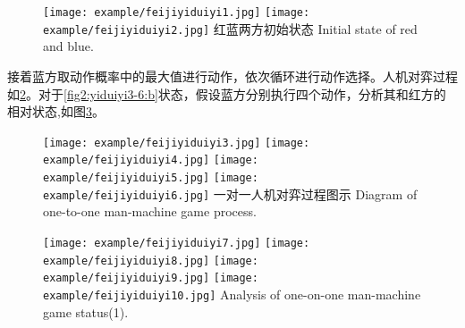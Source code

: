 \begin{figure}[htpb]
	\centering
	\subcaptionbox{\label{fig1:yiduiyi1-2:a}}
	{\texttt{[image: example/feijiyiduiyi1.jpg]}}
	\subcaptionbox{\label{fig1:yiduiyi1-2:b}}
	{\texttt{[image: example/feijiyiduiyi2.jpg]}}
	\bicaption
	{红蓝两方初始状态}
	{Initial state of red and blue.}
	\label{fig1:yiduiyi1-2}
\end{figure}


接着蓝方取动作概率中的最大值进行动作，依次循环进行动作选择。人机对弈过程如\ref{fig2:yiduiyi3-6}。对于\ref{fig2:yiduiyi3-6:b}状态，假设蓝方分别执行四个动作，分析其和红方的相对状态,如图\ref{fig2:yiduiyi7-10}。

\begin{figure}[htp]
	\centering
	\subcaptionbox{\label{fig2:yiduiyi3-6:a}}
	{\texttt{[image: example/feijiyiduiyi3.jpg]}}
	\subcaptionbox{\label{fig2:yiduiyi3-6:b}}
	{\texttt{[image: example/feijiyiduiyi4.jpg]}}
	\newline
	\centering
	\subcaptionbox{\label{fig2:yiduiyi3-6:c}}
	{\texttt{[image: example/feijiyiduiyi5.jpg]}}
	\subcaptionbox{\label{fig2:yiduiyi3-6:d}}
	{\texttt{[image: example/feijiyiduiyi6.jpg]}}
	\bicaption
	{一对一人机对弈过程图示}
	{Diagram of one-to-one man-machine game process.}
	\label{fig2:yiduiyi3-6}
\end{figure}


\begin{figure}[htbp]
	\centering
	{\texttt{[image: example/feijiyiduiyi7.jpg]}}
	\hspace{0.5em}
	{\texttt{[image: example/feijiyiduiyi8.jpg]}}
	\newline
	\centering
	{\texttt{[image: example/feijiyiduiyi9.jpg]}}
	\hspace{0.5em}
	{\texttt{[image: example/feijiyiduiyi10.jpg]}}
	{Analysis of one-on-one man-machine game status(1).}
	\label{fig2:yiduiyi7-10}
\end{figure}

